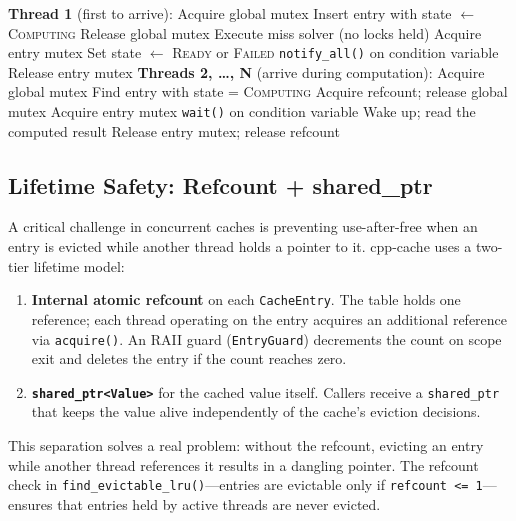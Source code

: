\documentclass[11pt,a4paper]{article}
\begin{document}
\begin{algorithm}[H]
\caption{Single-flight coordination for a cache miss}
\begin{algorithmic}[1]
\STATE \textbf{Thread 1} (first to arrive):
\STATE \quad Acquire global mutex
\STATE \quad Insert entry with state $\leftarrow$ \textsc{Computing}
\STATE \quad Release global mutex
\STATE \quad Execute miss solver (no locks held)
\STATE \quad Acquire entry mutex
\STATE \quad Set state $\leftarrow$ \textsc{Ready} or \textsc{Failed}
\STATE \quad \texttt{notify\_all()} on condition variable
\STATE \quad Release entry mutex
\STATE
\STATE \textbf{Threads 2, \ldots, N} (arrive during computation):
\STATE \quad Acquire global mutex
\STATE \quad Find entry with state = \textsc{Computing}
\STATE \quad Acquire refcount; release global mutex
\STATE \quad Acquire entry mutex
\STATE \quad \texttt{wait()} on condition variable
\STATE \quad Wake up; read the computed result
\STATE \quad Release entry mutex; release refcount
\end{algorithmic}
\end{algorithm}

\subsection{Lifetime Safety: Refcount + shared\_ptr}

A critical challenge in concurrent caches is preventing use-after-free
when an entry is evicted while another thread holds a pointer to it.
cpp-cache uses a two-tier lifetime model:

\begin{enumerate}
\item \textbf{Internal atomic refcount} on each \texttt{CacheEntry}.
      The table holds one reference; each thread operating on the entry
      acquires an additional reference via \texttt{acquire()}.  An RAII
      guard (\texttt{EntryGuard}) decrements the count on scope exit and
      deletes the entry if the count reaches zero.
\item \textbf{\texttt{shared\_ptr<Value>}} for the cached value itself.
      Callers receive a \texttt{shared\_ptr} that keeps the value alive
      independently of the cache's eviction decisions.
\end{enumerate}

This separation solves a real problem: without the refcount, evicting an
entry while another thread references it results in a dangling pointer.
The refcount check in \texttt{find\_evictable\_lru()}---entries are
evictable only if \texttt{refcount <= 1}---ensures that entries held by
active threads are never evicted.
\end{document}
